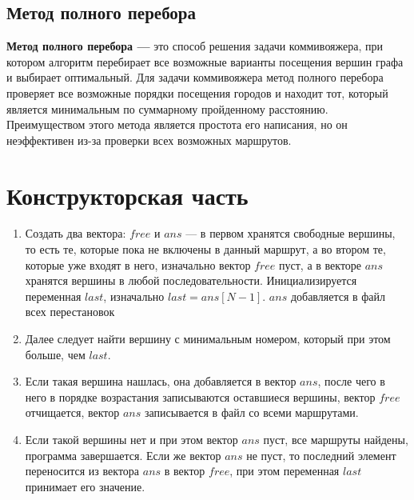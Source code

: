 \documentclass[12pt, a4paper]{article}
\begin{document}
\subsection{Метод полного перебора}
\textbf{Метод полного перебора ---} это способ решения задачи 
коммивояжера, при котором алгоритм перебирает все возможные 
варианты посещения вершин графа и выбирает оптимальный. Для задачи 
коммивояжера метод полного перебора проверяет все возможные 
порядки 
посещения городов и находит тот, который является минимальным по 
суммарному пройденному расстоянию.
Преимуществом этого метода является простота его написания, но он
неэффективен из-за проверки всех возможных маршрутов.
\section{Конструкторская часть}
\begin{enumerate}
	\item Создать два вектора: $free$ и $ans$ --- в первом 
	хранятся свободные вершины, то есть те, которые пока не 
	включены в данный маршрут, а во втором те, которые уже входят 
	в него, изначально вектор $free$ пуст, а в векторе $ans$ 
	хранятся вершины в любой последовательности. Инициализируется 
	переменная $last$, изначально $last = 
	ans[N-1]$. $ans$ добавляется в файл всех перестановок
	\item Далее следует найти вершину с минимальным номером, 
	который при этом больше, чем $last$. 
	\item Если такая вершина нашлась, она добавляется в вектор 
	$ans$, после чего в него в порядке возрастания записываются 
	оставшиеся вершины, вектор $free$ отчищается, вектор $ans$ 
	записывается в файл со всеми маршрутами.
	\item Если такой вершины нет и при этом вектор $ans$ пуст, все 
	маршруты найдены, программа завершается. Если же вектор $ans$ 
	не пуст, то последний элемент переносится из вектора $ans$ в 
	вектор $free$, при этом переменная $last$ принимает его 
	значение.
\end{enumerate}
\end{document}
